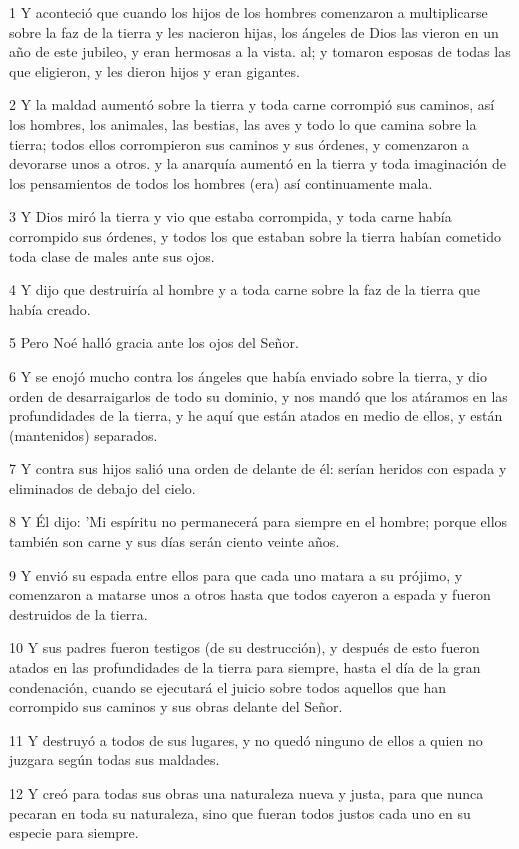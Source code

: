 \par 1 Y aconteció que cuando los hijos de los hombres comenzaron a multiplicarse sobre la faz de la tierra y les nacieron hijas, los ángeles de Dios las vieron en un año de este jubileo, y eran hermosas a la vista. al; y tomaron esposas de todas las que eligieron, y les dieron hijos y eran gigantes.
\par 2 Y la maldad aumentó sobre la tierra y toda carne corrompió sus caminos, así los hombres, los animales, las bestias, las aves y todo lo que camina sobre la tierra; todos ellos corrompieron sus caminos y sus órdenes, y comenzaron a devorarse unos a otros. y la anarquía aumentó en la tierra y toda imaginación de los pensamientos de todos los hombres (era) así continuamente mala.
\par 3 Y Dios miró la tierra y vio que estaba corrompida, y toda carne había corrompido sus órdenes, y todos los que estaban sobre la tierra habían cometido toda clase de males ante sus ojos.
\par 4 Y dijo que destruiría al hombre y a toda carne sobre la faz de la tierra que había creado.
\par 5 Pero Noé halló gracia ante los ojos del Señor.
\par 6 Y se enojó mucho contra los ángeles que había enviado sobre la tierra, y dio orden de desarraigarlos de todo su dominio, y nos mandó que los atáramos en las profundidades de la tierra, y he aquí que están atados en medio de ellos, y están (mantenidos) separados.
\par 7 Y contra sus hijos salió una orden de delante de él: serían heridos con espada y eliminados de debajo del cielo.
\par 8 Y Él dijo: 'Mi espíritu no permanecerá para siempre en el hombre; porque ellos también son carne y sus días serán ciento veinte años.
\par 9 Y envió su espada entre ellos para que cada uno matara a su prójimo, y comenzaron a matarse unos a otros hasta que todos cayeron a espada y fueron destruidos de la tierra.
\par 10 Y sus padres fueron testigos (de su destrucción), y después de esto fueron atados en las profundidades de la tierra para siempre, hasta el día de la gran condenación, cuando se ejecutará el juicio sobre todos aquellos que han corrompido sus caminos y sus obras delante del Señor.
\par 11 Y destruyó a todos de sus lugares, y no quedó ninguno de ellos a quien no juzgara según todas sus maldades.
\par 12 Y creó para todas sus obras una naturaleza nueva y justa, para que nunca pecaran en toda su naturaleza, sino que fueran todos justos cada uno en su especie para siempre.
